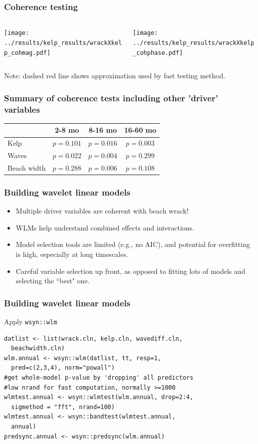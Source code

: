 \documentclass{beamer}
\begin{document}
\begin{frame}
\frametitle{Coherence testing}
\begin{columns}[c]
\begin{column}{6cm}
\texttt{[image: ../results/kelp\_results/wrackXkelp\_cohmag.pdf]}
\end{column}
\begin{column}{6cm}
\texttt{[image: ../results/kelp\_results/wrackXkelp\_cohphase.pdf]}
\end{column}
\end{columns}
Note: dashed red line shows approximation used by fast testing method.
\end{frame}

\begin{frame}
\frametitle{Summary of coherence tests including other 'driver' variables}
\begin{tabular}{lccc}
\hline
    & 2-8 mo & 8-16 mo & 16-60 mo \\ 
\hline
  Kelp & $p=0.101$ & \textbf{$p=0.016$} & $p=0.003$ \\ 
\hline
  Waves & $p=0.022$ & $p=0.004$ & $p=0.299$ \\ 
\hline
  Beach width & $p=0.288$ & $p=0.006$ & $p=0.108$ \\
\hline
\end{tabular}
\end{frame}

\begin{frame}
\frametitle{Building wavelet linear models}
\begin{itemize}
\item Multiple driver variables are coherent with beach wrack!
\item WLMs help understand combined effects and interactions.
\item Model selection tools are limited (e.g., no AIC), and potential for overfitting is high, especially at long timescales.
\item Careful variable selection up front, as opposed to fitting lots of models and selecting the ``best" one.
\end{itemize}
\end{frame}

\begin{frame}[fragile]
\frametitle{Building wavelet linear models}
\begin{exampleblock}{Apply \texttt{wsyn::wlm}}
\begin{verbatim}
datlist <- list(wrack.cln, kelp.cln, wavediff.cln, 
  beachwidth.cln)
wlm.annual <- wsyn::wlm(datlist, tt, resp=1, 
  pred=c(2,3,4), norm="powall")
#get whole-model p-value by 'dropping' all predictors
#low nrand for fast computation, normally >=1000
wlmtest.annual <- wsyn::wlmtest(wlm.annual, drop=2:4, 
  sigmethod = "fft", nrand=100)
wlmtest.annual <- wsyn::bandtest(wlmtest.annual, 
  annual)
predsync.annual <- wsyn::predsync(wlm.annual)
\end{verbatim}
\end{exampleblock}
\end{frame}
\end{document}
